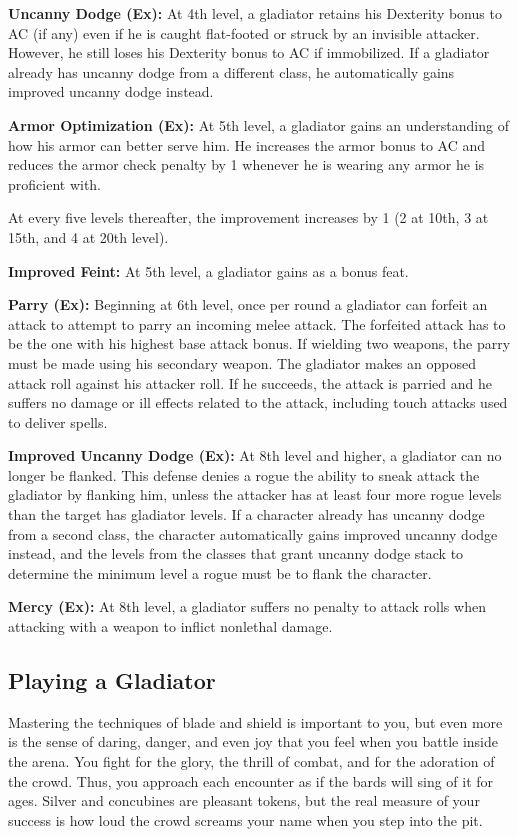 \textbf{Uncanny Dodge (Ex):} At 4th level, a gladiator retains his Dexterity bonus to AC (if any) even if he is caught flat-footed or struck by an invisible attacker. However, he still loses his Dexterity bonus to AC if immobilized. If a gladiator already has uncanny dodge from a different class, he automatically gains improved uncanny dodge instead.

\textbf{Armor Optimization (Ex):} At 5th level, a gladiator gains an understanding of how his armor can better serve him. He increases the armor bonus to AC and reduces the armor check penalty by 1 whenever he is wearing any armor he is proficient with.

At every five levels thereafter, the improvement increases by 1 (2 at 10th, 3 at 15th, and 4 at 20th level).

\textbf{Improved Feint:} At 5th level, a gladiator gains  as a bonus feat.

\textbf{Parry (Ex):} Beginning at 6th level, once per round a gladiator can forfeit an attack to attempt to parry an incoming melee attack. The forfeited attack has to be the one with his highest base attack bonus. If wielding two weapons, the parry must be made using his secondary weapon. The gladiator makes an opposed attack roll against his attacker roll. If he succeeds, the attack is parried and he suffers no damage or ill effects related to the attack, including touch attacks used to deliver spells.

\textbf{Improved Uncanny Dodge (Ex):} At 8th level and higher, a gladiator can no longer be flanked. This defense denies a rogue the ability to sneak attack the gladiator by flanking him, unless the attacker has at least four more rogue levels than the target has gladiator levels. If a character already has uncanny dodge from a second class, the character automatically gains improved uncanny dodge instead, and the levels from the classes that grant uncanny dodge stack to determine the minimum level a rogue must be to flank the character.

\textbf{Mercy (Ex):} At 8th level, a gladiator suffers no penalty to attack rolls when attacking with a weapon to inflict nonlethal damage.

\subsection{Playing a Gladiator}
Mastering the techniques of blade and shield is important to you, but even more is the sense of daring, danger, and even joy that you feel when you battle inside the arena. You fight for the glory, the thrill of combat, and for the adoration of the crowd. Thus, you approach each encounter as if the bards will sing of it for ages. Silver and concubines are pleasant tokens, but the real measure of your success is how loud the crowd screams your name when you step into the pit.

